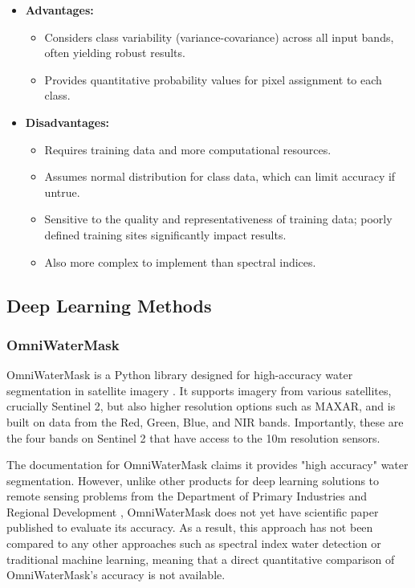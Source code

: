 \begin{itemize}
    \item \textbf{Advantages:}
    \begin{itemize}
        \item Considers class variability (variance-covariance) across all input bands, often yielding robust results.
        \item Provides quantitative probability values for pixel assignment to each class.
    \end{itemize}
    \item \textbf{Disadvantages:}
    \begin{itemize}
        \item Requires training data and more computational resources.
        \item Assumes normal distribution for class data, which can limit accuracy if untrue.
        \item Sensitive to the quality and representativeness of training data; poorly defined training sites significantly impact results.
        \item Also more complex to implement than spectral indices.
    \end{itemize}
\end{itemize}

\subsection{Deep Learning Methods}
\subsubsection{OmniWaterMask}
OmniWaterMask is a Python library designed for high-accuracy water segmentation in satellite imagery \citep{dpird-dma_2024}. It supports imagery from various satellites, crucially Sentinel 2, but also higher resolution options such as MAXAR, and is built on data from the Red, Green, Blue, and NIR bands. Importantly, these are the four bands on Sentinel 2 that have access to the 10m resolution sensors. 

The documentation for OmniWaterMask claims it provides "high accuracy" water segmentation. However, unlike other products for deep learning solutions to remote sensing problems from the Department of Primary Industries and Regional Development \citep{wright_2025}, OmniWaterMask does not yet have scientific paper published to evaluate its accuracy. As a result, this approach has not been compared to any other approaches such as spectral index water detection or traditional machine learning, meaning that a direct quantitative comparison of OmniWaterMask's accuracy is not available.

